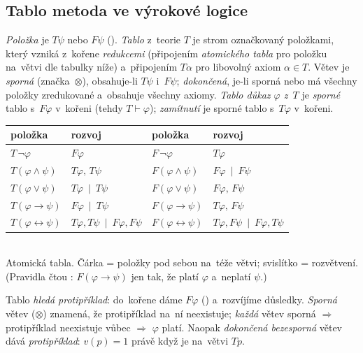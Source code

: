 \documentclass[11pt,a4paper]{article}
\newcommand{\closed}{\ensuremath{\otimes}}            %
\begin{document}
\subsection{Tablo metoda ve výrokové logice}

\begin{definice}
\emph{Položka} je $T\psi$ nebo $F\psi$ (). \emph{Tablo} z~teorie $T$ je strom označkovaný položkami, který vzniká z~kořene \emph{redukcemi} (připojením \emph{atomického tabla} pro položku na~větvi dle tabulky níže) a~připojením $T\alpha$ pro libovolný axiom $\alpha\in T$. Větev je \emph{sporná} (značka~\closed), obsahuje-li $T\psi$ i~$F\psi$; \emph{dokončená}, je-li sporná nebo má všechny položky zredukované a~obsahuje všechny axiomy. \emph{Tablo důkaz $\varphi$ z~$T$} je \emph{sporné} tablo s~$F\varphi$ v~kořeni (tehdy $T\vdash\varphi$); \emph{zamítnutí} je sporné tablo s~$T\varphi$ v~kořeni.
\end{definice}

\begin{center}
\renewcommand{\arraystretch}{1.15}
\begin{tabular}{ll@{\qquad}ll}
\toprule
položka & rozvoj & položka & rozvoj\\
\midrule
$T\,\neg\varphi$ & $F\varphi$ & $F\,\neg\varphi$ & $T\varphi$\\
$T(\varphi\wedge\psi)$ & $T\varphi,\,T\psi$ & $F(\varphi\wedge\psi)$ & $F\varphi\ \mid\ F\psi$\\
$T(\varphi\vee\psi)$ & $T\varphi\ \mid\ T\psi$ & $F(\varphi\vee\psi)$ & $F\varphi,\,F\psi$\\
$T(\varphi\to\psi)$ & $F\varphi\ \mid\ T\psi$ & $F(\varphi\to\psi)$ & $T\varphi,\,F\psi$\\
$T(\varphi\leftrightarrow\psi)$ & $T\varphi,T\psi\ \mid\ F\varphi,F\psi$ & $F(\varphi\leftrightarrow\psi)$ & $T\varphi,F\psi\ \mid\ F\varphi,T\psi$\\
\bottomrule
\end{tabular}\\[1mm]
{\small Atomická tabla. Čárka \uv{$,$} = položky pod sebou na~téže větvi; svislítko \uv{$\mid$} = rozvětvení. (Pravidla čtou : $F(\varphi\to\psi)$ jen tak, že platí $\varphi$ a~neplatí $\psi$.)}
\end{center}

\begin{intuice}
Tablo \emph{hledá protipříklad}: do~kořene dáme $F\varphi$ () a~rozvíjíme důsledky. \emph{Sporná} větev (\closed) znamená, že protipříklad na~ní neexistuje; \emph{každá} větev sporná $\Rightarrow$ protipříklad neexistuje vůbec $\Rightarrow$ $\varphi$ platí. Naopak \emph{dokončená bezesporná} větev dává \emph{protipříklad}:  $v(p)=1$ právě když je na~větvi $Tp$.
\end{intuice}
\end{document}
